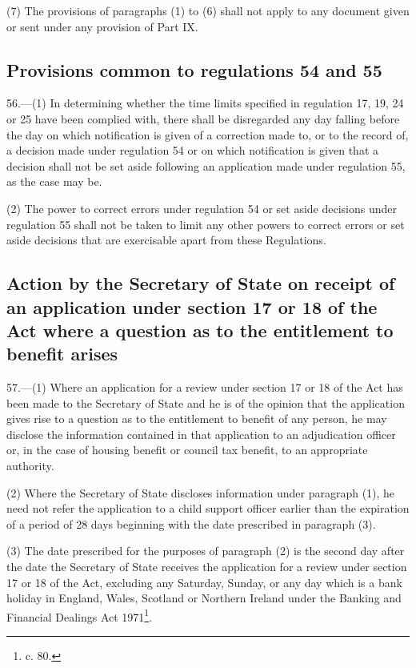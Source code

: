\documentclass[a4paper]{article}
\begin{document}
(7) The provisions of paragraphs (1) to (6) shall not apply to any document given or sent under any provision of Part IX.

\subsection[56. Provisions common to regulations 54 and 55]{Provisions common to regulations 54 and 55}

56.—(1) In determining whether the time limits specified in regulation 17, 19, 24 or 25 have been complied with, there shall be disregarded any day falling before the day on which notification is given of a correction made to, or to the record of, a decision made under regulation 54 or on which notification is given that a decision shall not be set aside following an application made under regulation 55, as the case may be.

(2) The power to correct errors under regulation 54 or set aside decisions under regulation 55 shall not be taken to limit any other powers to correct errors or set aside decisions that are exercisable apart from these Regulations.

\subsection[57. Action by the Secretary of State on receipt of an application under section 17 or 18 of the Act where a question as to the entitlement to benefit arises]{Action by the Secretary of State on receipt of an application under section 17 or 18 of the Act where a question as to the entitlement to benefit arises}

57.—(1) Where an application for a review under section 17 or 18 of the Act has been made to the Secretary of State and he is of the opinion that the application gives rise to a question as to the entitlement to benefit of any person, he may disclose the information contained in that application to an adjudication officer or, in the case of housing benefit or council tax benefit, to an appropriate authority.

(2) Where the Secretary of State discloses information under paragraph (1), he need not refer the application to a child support officer earlier than the expiration of a period of 28 days beginning with the date prescribed in paragraph (3).

(3) The date prescribed for the purposes of paragraph (2) is the second day after the date the Secretary of State receives the application for a review under section 17 or 18 of the Act, excluding any Saturday, Sunday, or any day which is a bank holiday in England, Wales, Scotland or Northern Ireland under the Banking and Financial Dealings Act 1971\footnote{ c. 80.}.
\end{document}
